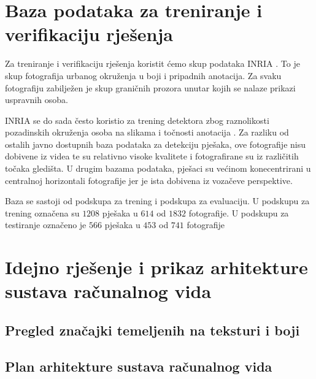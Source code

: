 \documentclass[seminar]{fer}
\begin{document}
\chapter{Baza podataka za treniranje i verifikaciju rješenja}

Za treniranje i verifikaciju rješenja koristit ćemo skup podataka INRIA \cite{DT05}. To je skup fotografija urbanog okruženja u boji i pripadnih anotacija. Za svaku fotografiju zabilježen je skup graničnih prozora  unutar kojih se nalaze prikazi uspravnih osoba. %

INRIA se do sada često koristio za trening detektora zbog raznolikosti pozadinskih okruženja osoba na slikama i točnosti anotacija \cite{BenensonOHS14}. Za razliku od ostalih javno dostupnih baza podataka za detekciju pješaka, ove fotografije nisu dobivene iz videa te su relativno visoke kvalitete i fotografirane su iz različitih točaka gledišta. U drugim bazama podataka, pješaci su većinom konecentrirani u centralnoj horizontali fotografije jer je ista dobivena iz vozačeve perspektive.

Baza se sastoji od podskupa za trening i podskupa za evaluaciju. U podskupu za trening označena su $1208$ pješaka u $614$ od $1832$ fotografije. U podskupu za testiranje označeno je $566$ pješaka u $453$ od $741$ fotografije \cite{Dollar:2012:PDE:2197081.2197275}

\chapter{Idejno rješenje i prikaz arhitekture sustava računalnog vida}

\section{Pregled značajki temeljenih na teksturi i boji}

\section{Plan arhitekture sustava računalnog vida}


\end{document}
